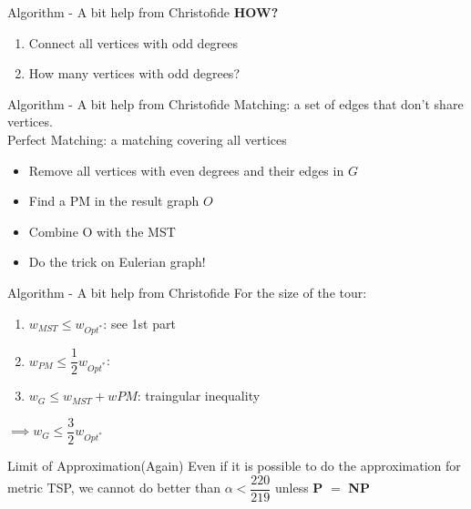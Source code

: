 \documentclass{beamer}
\newcommand*{\brk}{\\[10pt]}
\begin{document}
\begin{frame}{Algorithm - A bit help from Christofide}
    \textbf{HOW?}
    \begin{enumerate}
        \item<1-> Connect all vertices with odd degrees
        \item<2-> How many vertices with odd degrees?
    \end{enumerate}
\end{frame}

\begin{frame}{Algorithm - A bit help from Christofide}
    Matching: a set of edges that don't share vertices. \brk 
    Perfect Matching: a matching covering all vertices \brk 
    \pause 
    \begin{itemize}
        \item Remove all vertices with even degrees and their edges in $G$
        \item Find a PM in the result graph $O$
        \item Combine O with the MST
        \item Do the trick on Eulerian graph!
    \end{itemize}
\end{frame}

\begin{frame}{Algorithm - A bit help from Christofide}
    For the size of the tour:
    \begin{enumerate}
        \item $w_{MST} \leq w_{Opt^*}$: see 1st part
        \item $w_{PM} \leq \dfrac{1}{2} w_{Opt^*}$:
        \item $w_{G} \leq w_{MST} + w{PM}$: traingular inequality
    \end{enumerate}
    $\implies w_{G} \leq \dfrac{3}{2} w_{Opt^*}$
\end{frame}

\begin{frame}{Limit of Approximation(Again)}
    Even if it is possible to do the approximation for metric TSP, we cannot do better than $\alpha < \dfrac{220}{219}$
    unless \textbf{P} $=$ \textbf{NP}
\end{frame}
\end{document}
